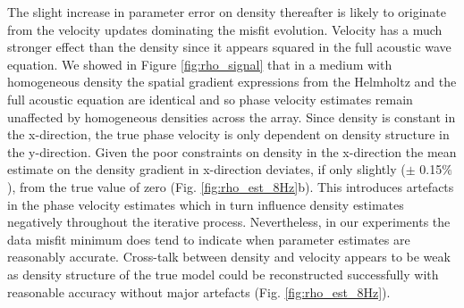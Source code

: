 \documentclass[]{article}
\begin{document}
	The slight increase in parameter error on density thereafter is likely to originate from the velocity updates dominating the misfit evolution. Velocity has a much stronger effect than the density since it appears squared in the full acoustic wave equation. We showed in Figure \ref{fig:rho_signal} that in a medium with homogeneous density the spatial gradient expressions from the Helmholtz and the full acoustic equation are identical and so phase velocity estimates remain unaffected by homogeneous densities across the array. Since density is constant in the x-direction, the true phase velocity is only dependent on density structure in the y-direction. Given the poor constraints on density in the x-direction the mean estimate on the density gradient in x-direction deviates, if only slightly ($\pm$ 0.15$\%$), from the true value of zero (Fig. \ref{fig:rho_est_8Hz}b). This introduces artefacts in the phase velocity estimates which in turn influence density estimates negatively throughout the iterative process. Nevertheless, in our experiments the data misfit minimum does tend to indicate when parameter estimates are reasonably accurate. Cross-talk between density and velocity appears to be weak as density structure of the true model could be reconstructed successfully with reasonable accuracy without major artefacts (Fig. \ref{fig:rho_est_8Hz}).
\end{document}
